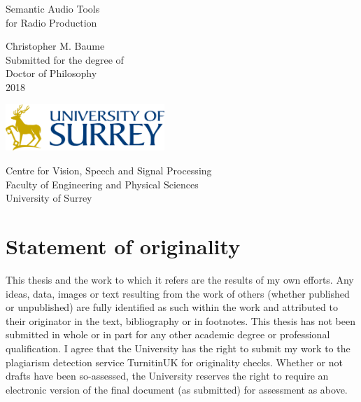 \documentclass[11pt,a4paper,twoside,openany]{book}
\begin{document}
\pagestyle{plain}
\frontmatter

\begin{titlepage}
  \vspace*{\fill}
  \begin{center}
    {\Huge Semantic Audio Tools\\for Radio Production\par\vspace{1.5cm}}
    {\Large Christopher M. Baume}\\[1cm]
    {\large Submitted for the degree of}\\
    {\Large Doctor of Philosophy}\\[1cm]
    {\Large 2018}\\[1cm]
    \begin{center}
      \includegraphics[width=6cm]{figs/surrey-logo.png}\\[1cm]
    \end{center}
    Centre for Vision, Speech and Signal Processing\\
      Faculty of Engineering and Physical Sciences\\
      University of Surrey%
  \end{center}
  \vspace*{\fill}
\end{titlepage}

\setcounter{page}{0}
\cleardoublepage


\chapter*{Statement of originality}
This thesis and the work to which it refers are the results of my own efforts. Any ideas, data, images or text
resulting from the work of others (whether published or unpublished) are fully identified as such within the work and
attributed to their originator in the text, bibliography or in footnotes. This thesis has not been submitted in whole
or in part for any other academic degree or professional qualification.  I agree that the University has the right to
submit my work to the plagiarism detection service TurnitinUK for originality checks.  Whether or not drafts have been
so-assessed, the University reserves the right to require an electronic version of the final document (as submitted)
for assessment as above. 
\end{document}
